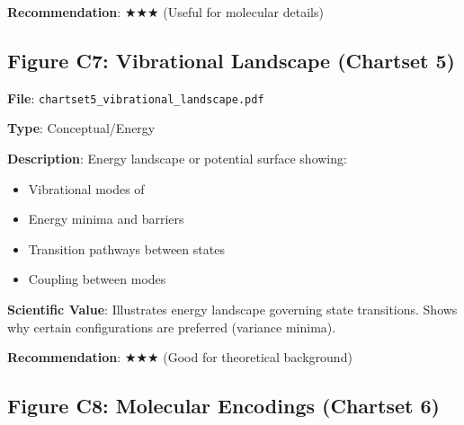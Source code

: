 \documentclass[11pt]{article}
\begin{document}
\textbf{Recommendation}: $\bigstar\bigstar\bigstar$ (Useful for molecular details)

\subsection{Figure C7: Vibrational Landscape (Chartset 5)}


\textbf{File}: \texttt{chartset5\_vibrational\_landscape.pdf}

\textbf{Type}: Conceptual/Energy

\textbf{Description}:
Energy landscape or potential surface showing:
\begin{itemize}
\item Vibrational modes of 
\item Energy minima and barriers
\item Transition pathways between states
\item Coupling between modes
\end{itemize}

\textbf{Scientific Value}:
Illustrates energy landscape governing state transitions. Shows why certain configurations are preferred (variance minima).

\textbf{Recommendation}: $\bigstar\bigstar\bigstar$ (Good for theoretical background)

\subsection{Figure C8: Molecular Encodings (Chartset 6)}

\end{document}
